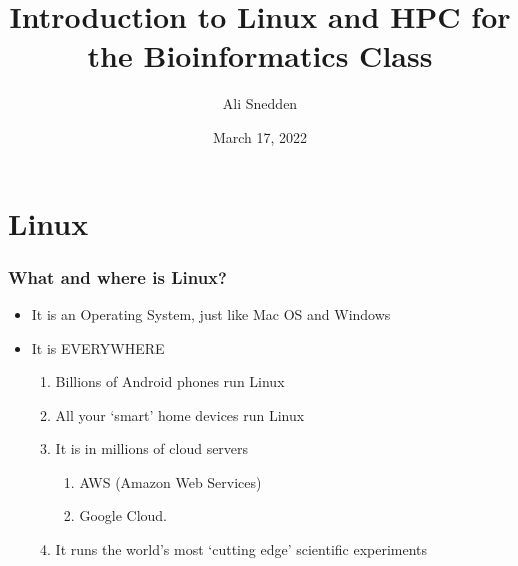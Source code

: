 \documentclass{beamer}
\title{Introduction to Linux and HPC for the Bioinformatics Class}
\author{Ali Snedden}
\institute{Nationwide Children's Hospital}
\date{March 17, 2022}
\begin{document}
 
\frame{\titlepage}

\section{Linux}

\begin{frame}
\frametitle{What and where is Linux?}
\begin{itemize}
    \item It is an Operating System, just like Mac OS and Windows  
    \pause 
    \item It is EVERYWHERE
    \begin{enumerate}
        \item Billions of Android phones run Linux
        \pause 
        \item All your `smart' home devices run Linux
        \pause 
        \item It is in millions of cloud servers
        \begin{enumerate}
            \item AWS (Amazon Web Services)
            \item Google Cloud.
        \end{enumerate}
        \pause 
        \item It runs the world's most `cutting edge' scientific experiments
    \end{enumerate}
\end{itemize}
\end{frame}
\end{document}
